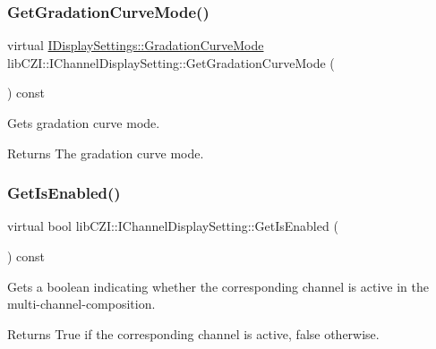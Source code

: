 \subsubsection{\texorpdfstring{Get\+Gradation\+Curve\+Mode()}{GetGradationCurveMode()}}
{\footnotesize\ttfamily virtual \hyperlink{classlib_c_z_i_1_1_i_display_settings_af114dfcc8a603ca1c2fc57bc35c97684}{I\+Display\+Settings\+::\+Gradation\+Curve\+Mode} lib\+C\+Z\+I\+::\+I\+Channel\+Display\+Setting\+::\+Get\+Gradation\+Curve\+Mode (\begin{DoxyParamCaption}{ }\end{DoxyParamCaption}) const\hspace{0.3cm}{\ttfamily [pure virtual]}}

Gets gradation curve mode.

\begin{DoxyReturn}{Returns}
The gradation curve mode. 
\end{DoxyReturn}
\mbox{\label{classlib_c_z_i_1_1_i_channel_display_setting_a874cb106b686e6f4b7fad2f6dd1b3eed}} 
\subsubsection{\texorpdfstring{Get\+Is\+Enabled()}{GetIsEnabled()}}
{\footnotesize\ttfamily virtual bool lib\+C\+Z\+I\+::\+I\+Channel\+Display\+Setting\+::\+Get\+Is\+Enabled (\begin{DoxyParamCaption}{ }\end{DoxyParamCaption}) const\hspace{0.3cm}{\ttfamily [pure virtual]}}

Gets a boolean indicating whether the corresponding channel is \textquotesingle{}active\textquotesingle{} in the multi-\/channel-\/composition.

\begin{DoxyReturn}{Returns}
True if the corresponding channel is \textquotesingle{}active\textquotesingle{}, false otherwise. 
\end{DoxyReturn}
\mbox{\label{classlib_c_z_i_1_1_i_channel_display_setting_ad4b5a8fed9cad0b28acbbfed7736a8d0}} 
